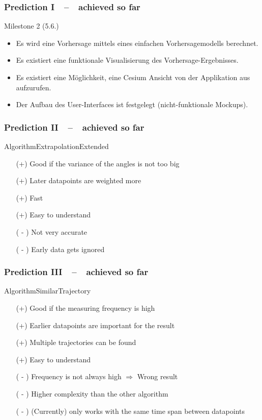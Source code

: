 \documentclass[xcolor=dvipsnames]{beamer}
\begin{document}
\begin{frame}
	\frametitle{\textbf{Prediction I}~~--~~achieved so far}
	\large{Milestone 2 (5.6.)}
	\normalsize
	\begin{itemize} 
		\item \color{Green}Es wird eine Vorhersage mittels eines einfachen Vorhersagemodells berechnet.
		\item \color{LightGray}Es existiert eine funktionale Visualisierung des Vorhersage-Ergebnisses.
		\item \color{LightGray}Es existiert eine Möglichkeit, eine Cesium Ansicht von der Applikation aus aufzurufen.
		\item \color{LightGray}Der Aufbau des User-Interfaces ist festgelegt (nicht-funktionale Mockups).
	\end{itemize}
\end{frame}

\begin{frame}
	\frametitle{\textbf{Prediction II}~~--~~achieved so far}
	\Large{AlgorithmExtrapolationExtended}
	\normalsize{}
			\begin{itemize}
				\item[(+)] Good if the variance of the angles is not too big
				\item[(+)] Later datapoints are weighted more
				\item[(+)] Fast
				\item[(+)] Easy to understand
				\item[] 
				\item[( - )] Not very accurate
				\item[( - )] Early data gets ignored

			\end{itemize}
\end{frame}

\begin{frame}
	\frametitle{\textbf{Prediction III}~~--~~achieved so far}
	\Large{AlgorithmSimilarTrajectory}
	\normalsize{}
			\begin{itemize}
				\item[(+)] Good if the measuring frequency is high
				\item[(+)] Earlier datapoints are important for the result
				\item[(+)] Multiple trajectories can be found
				\item[(+)] Easy to understand
				\item[] 
				\item[( - )] Frequency is not always high $\Rightarrow$ Wrong result
				\item[( - )] Higher complexity than the other algorithm
				\item[( - )] (Currently) only works with the same time span between datapoints
			\end{itemize}
\end{frame}
\end{document}

